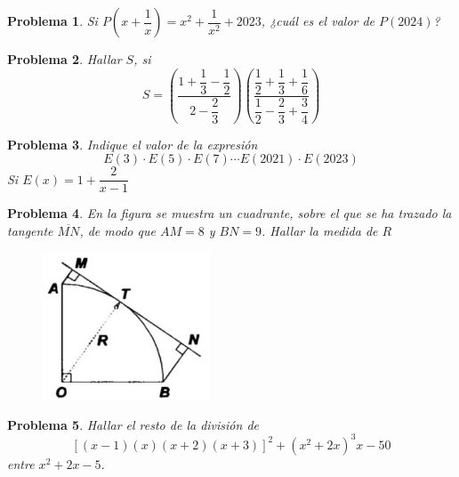 \documentclass[12pt]{beamer}
\newtheorem{section-problem}{Problema}
\begin{document}
   \begin{frame}
      \begin{section-problem}
         Si $P\left(x + \dfrac{1}{x}\right) = x^2 + \dfrac{1}{x^2} + 2023$, ¿cuál es el valor de $P(2024)$?
      \end{section-problem}
   \end{frame}

   \begin{frame}
      \begin{section-problem}
         Hallar $S$, si
         \[S = \left( \frac{1 + \dfrac{1}{3} - \dfrac{1}{2}}{2 - \dfrac{2}{3}} \right) \left( \frac{\dfrac{1}{2} + \dfrac{1}{3} + \dfrac{1}{6}}{\dfrac{1}{2} - \dfrac{2}{3} + \dfrac{3}{4}} \right)\]
      \end{section-problem}
   \end{frame}

   \begin{frame}
      \begin{section-problem}
         Indique el valor de la expresión
         \[E(3)  \cdot E(5) \cdot E(7) \cdots E(2021) \cdot E(2023)\]
         Si $E(x) = 1 + \dfrac{2}{x - 1}$
      \end{section-problem}
   \end{frame}

   \begin{frame}
      \begin{section-problem}
         En la figura se muestra un cuadrante, sobre el que se ha trazado la tangente $\overline{MN}$, de modo que $AM = 8$ y $BN = 9$.
         Hallar la medida de $R$
         \begin{figure}[htb]
            \centering
            \includegraphics[width=5cm]{image4.geo}
         \end{figure}
      \end{section-problem}
   \end{frame}

   \begin{frame}
      \begin{section-problem}
         Hallar el resto de la división de
         \[
            \left[(x - 1)(x)(x + 2)(x + 3)\right]^2 + (x^2 + 2x)^3 x - 50
         \]
         entre $x^2 + 2x - 5$.
      \end{section-problem}
   \end{frame}
\end{document}
